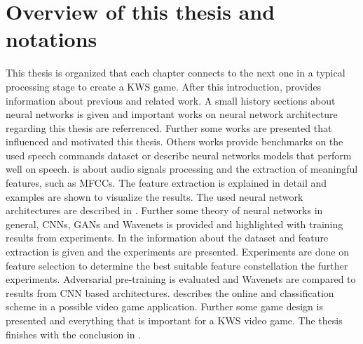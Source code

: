 
\section{Overview of this thesis and notations}\label{sec:intro_overview}
\thesisStateReady
This thesis is organized that each chapter connects to the next one in a typical processing stage to create a KWS game.
After this introduction,  provides information about previous and related work.
A small history sections about neural networks is given and important works on neural network architecture regarding this thesis are referrenced.
Further some works are presented that influenced and motivated this thesis.
Others works provide benchmarks on the used speech commands dataset or describe neural networks models that perform well on speech.
 is about audio signals processing and the extraction of meaningful features, such as MFCCs.
The feature extraction is explained in detail and examples are shown to visualize the results.
The used neural network architectures are described in . 
Further some theory of neural networks in general, CNNs, GANs and Wavenets is provided and highlighted with training results from experiments.
In the  information about the dataset and feature extraction is given and the experiments are presented.
Experiments are done on feature selection to determine the best suitable feature constellation the further experiments.
Adversarial pre-training is evaluated and Wavenets are compared to results from CNN based architectures.
 describes the online and classification scheme in a possible video game application.
Further some game design is presented and everything that is important for a KWS video game.
The thesis finishes with the conclusion in .



